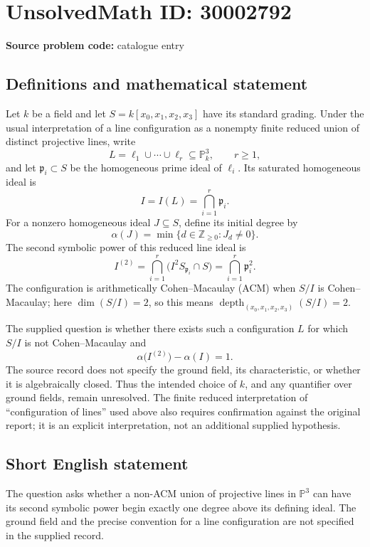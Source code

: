 \documentclass[11pt]{article}
\begin{document}
\section*{UnsolvedMath ID: 30002792}
\textbf{Source problem code:} catalogue entry
\subsection{Definitions and mathematical statement}
Let \(k\) be a field and let \(S=k[x_0,x_1,x_2,x_3]\) have its standard grading. Under the usual interpretation of a line configuration as a nonempty finite reduced union of distinct projective lines, write
\[
L=\ell_1\cup\cdots\cup\ell_r\subseteq\mathbb P^3_k,\qquad r\geq1,
\]
and let \(\mathfrak p_i\subset S\) be the homogeneous prime ideal of \(\ell_i\). Its saturated homogeneous ideal is
\[
I=I(L)=\bigcap_{i=1}^r\mathfrak p_i.
\]
For a nonzero homogeneous ideal \(J\subseteq S\), define its initial degree by
\[
\alpha(J)=\min\{d\in\mathbb Z_{\geq0}:J_d\neq0\}.
\]
The second symbolic power of this reduced line ideal is
\[
I^{(2)}=\bigcap_{i=1}^r\bigl(I^2S_{\mathfrak p_i}\cap S\bigr)
=\bigcap_{i=1}^r\mathfrak p_i^2.
\]
The configuration is arithmetically Cohen--Macaulay (ACM) when \(S/I\) is Cohen--Macaulay; here \(\dim(S/I)=2\), so this means \(\operatorname{depth}_{(x_0,x_1,x_2,x_3)}(S/I)=2\).

The supplied question is whether there exists such a configuration \(L\) for which \(S/I\) is not Cohen--Macaulay and
\[
\alpha\bigl(I^{(2)}\bigr)-\alpha(I)=1.
\]
The source record does not specify the ground field, its characteristic, or whether it is algebraically closed. Thus the intended choice of \(k\), and any quantifier over ground fields, remain unresolved. The finite reduced interpretation of ``configuration of lines'' used above also requires confirmation against the original report; it is an explicit interpretation, not an additional supplied hypothesis.
\subsection{Short English statement}
The question asks whether a non-ACM union of projective lines in \(\mathbb P^3\) can have its second symbolic power begin exactly one degree above its defining ideal. The ground field and the precise convention for a line configuration are not specified in the supplied record.
\end{document}
